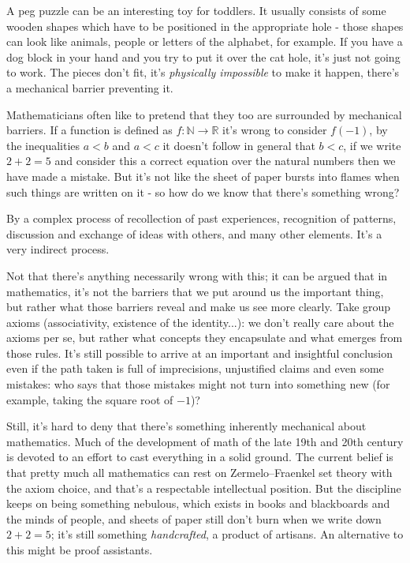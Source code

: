 \documentclass{book}
\theoremstyle{definition}
\theoremstyle{remark}
\theoremstyle{plain}
\newcommand{\NN}{\mathbb{N}}
\newcommand{\RR}{\mathbb{R}}
\begin{document}
A peg puzzle can be an interesting toy for toddlers.
It usually consists of some wooden shapes which have to be
positioned in the appropriate hole - those shapes can look like animals, people or letters of the alphabet, for example.
If you have a dog block in your hand and you try to put it over the cat hole,
it's just not going to work. The pieces don't fit, it's \textit{physically impossible} to make it happen,
there's a mechanical barrier preventing it.

Mathematicians often like to pretend that they too are surrounded by mechanical barriers.
If a function is defined as $f : \NN \to \RR$ it's wrong to consider $f(-1)$,
by the inequalities $a < b$ and $a < c$ it doesn't follow in general that $b < c$,
if we write $2 + 2 = 5$ and consider this a correct equation over the natural numbers then we have made a mistake.
But it's not like the sheet of paper bursts into flames when such things are written on it -
so how do we know that there's something wrong?

By a complex process of recollection of past experiences, recognition of patterns,
discussion and exchange of ideas with others, and many other elements.
It's a very indirect process.

Not that there's anything necessarily wrong with this;
it can be argued that in mathematics, it's not the barriers that we put around us the important thing,
but rather what those barriers reveal and make us see more clearly.
Take group axioms (associativity, existence of the identity...): we don't really care about the axioms per se,
but rather what concepts they encapsulate and what emerges from those rules.
It's still possible to arrive at an important and insightful conclusion even if the path taken
is full of imprecisions, unjustified claims and even some mistakes:
who says that those mistakes might not turn into something new (for example, taking the square root of $-1$)?

Still, it's hard to deny that there's something inherently mechanical about mathematics.
Much of the development of math of the late 19th and 20th century is devoted to an effort to
cast everything in a solid ground. The current belief is that pretty much all mathematics can rest on Zermelo–Fraenkel set theory
with the axiom choice, and that's a respectable intellectual position.
But the discipline keeps on being something nebulous, which exists in books and blackboards and the minds of people,
and sheets of paper still don't burn when we write down $2 + 2 = 5$; it's still something \textit{handcrafted}, a product of artisans.
\newpage
An alternative to this might be proof assistants.
\end{document}
